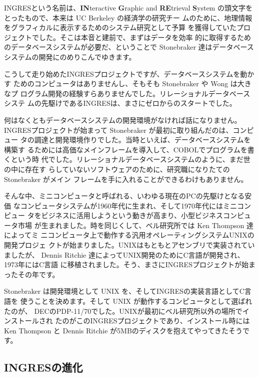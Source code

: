 
INGRESという名前は、{\bf IN}teractive {\bf G}raphic and {\bf RE}trieval
{\bf S}ystem の頭文字をとったもので、本来は UC Berkeley の経済学の研究チー
ムのために、地理情報をグラフィカルに表示するためのシステム研究として予算
を獲得していたプロジェクトでした。そこは本音と建前で、まずはデータを効率
的に取得するためのデータベースシステムが必要だ、ということで Stonebraker
達はデータベースシステムの開発にのめりこんでゆきます。

こうして走り始めたINGRESプロジェクトですが、データベースシステムを動かす
ためのコンピュータはありませんし、そもそも Stonebraker や Wong は大きなプ
ログラム開発の経験すらありませんでした。リレーショナルデータベースシステ
ムの先駆けであるINGRESは、まさにゼロからのスタートでした。

何はなくともデータベースシステムの開発環境がなければ話になりません。
INGRESプロジェクトが始まって Stonebraker が最初に取り組んだのは、コンピュー
タの調達と開発環境作りでした。当時といえば、データベースシステムを構築す
るためには高価なメインフレームを導入して、COBOLでプログラムを書くという時
代でした。リレーショナルデータベースシステムのように、まだ世の中に存在す
らしていないソフトウェアのために、研究職になりたての Stonebraker がメイン
フレームを手に入れることができるわけもありません。

そんな中、ミニコンピュータと呼ばれる、いわゆる現在のPCの先駆けとなる安価
なコンピュータシステムが1960年代に生まれ、そして1970年代にはミニコンピュー
タをビジネスに活用しようという動きが高まり、小型ビジネスコンピュータ市場
が生まれました。時を同じくして、ベル研究所では Ken Thompson 達によってミ
ニコンピュータ上で動作する汎用オペレーティングシステムUNIXの開発プロジェ
クトが始まりました。UNIXはもともとアセンブリで実装されていましたが、
Dennis Ritchie 達によってUNIX開発のためにC言語が開発され、1973年にはC言語
に移植されました。そう、まさにINGRESプロジェクトが始まったその年です。

Stonebraker は開発環境として UNIX を、そしてINGRESの実装言語としてC言語を
使うことを決めます。そして UNIX が動作するコンピュータとして選ばれたのが、
DECのPDP-11/70でした。UNIXが最初にベル研究所以外の場所でインストールされ
たのがこのINGRESプロジェクトであり、インストール時には Ken Thompson と
Dennis Ritchie が5MBのディスクを抱えてやってきたそうです。

\subsection{INGRESの進化}

